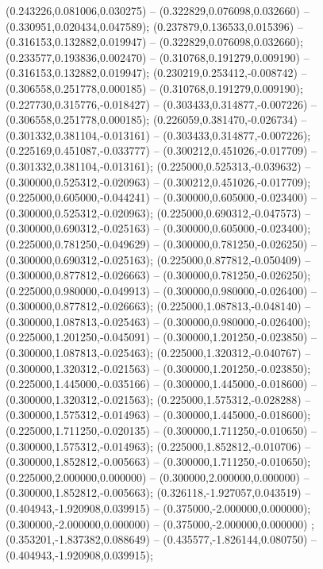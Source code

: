  (0.243226,0.081006,0.030275) -- (0.322829,0.076098,0.032660) -- (0.330951,0.020434,0.047589);
 (0.237879,0.136533,0.015396) -- (0.316153,0.132882,0.019947) -- (0.322829,0.076098,0.032660);
 (0.233577,0.193836,0.002470) -- (0.310768,0.191279,0.009190) -- (0.316153,0.132882,0.019947);
 (0.230219,0.253412,-0.008742) -- (0.306558,0.251778,0.000185) -- (0.310768,0.191279,0.009190);
 (0.227730,0.315776,-0.018427) -- (0.303433,0.314877,-0.007226) -- (0.306558,0.251778,0.000185);
 (0.226059,0.381470,-0.026734) -- (0.301332,0.381104,-0.013161) -- (0.303433,0.314877,-0.007226);
 (0.225169,0.451087,-0.033777) -- (0.300212,0.451026,-0.017709) -- (0.301332,0.381104,-0.013161);
 (0.225000,0.525313,-0.039632) -- (0.300000,0.525312,-0.020963) -- (0.300212,0.451026,-0.017709);
 (0.225000,0.605000,-0.044241) -- (0.300000,0.605000,-0.023400) -- (0.300000,0.525312,-0.020963);
 (0.225000,0.690312,-0.047573) -- (0.300000,0.690312,-0.025163) -- (0.300000,0.605000,-0.023400);
 (0.225000,0.781250,-0.049629) -- (0.300000,0.781250,-0.026250) -- (0.300000,0.690312,-0.025163);
 (0.225000,0.877812,-0.050409) -- (0.300000,0.877812,-0.026663) -- (0.300000,0.781250,-0.026250);
 (0.225000,0.980000,-0.049913) -- (0.300000,0.980000,-0.026400) -- (0.300000,0.877812,-0.026663);
 (0.225000,1.087813,-0.048140) -- (0.300000,1.087813,-0.025463) -- (0.300000,0.980000,-0.026400);
 (0.225000,1.201250,-0.045091) -- (0.300000,1.201250,-0.023850) -- (0.300000,1.087813,-0.025463);
 (0.225000,1.320312,-0.040767) -- (0.300000,1.320312,-0.021563) -- (0.300000,1.201250,-0.023850);
 (0.225000,1.445000,-0.035166) -- (0.300000,1.445000,-0.018600) -- (0.300000,1.320312,-0.021563);
 (0.225000,1.575312,-0.028288) -- (0.300000,1.575312,-0.014963) -- (0.300000,1.445000,-0.018600);
 (0.225000,1.711250,-0.020135) -- (0.300000,1.711250,-0.010650) -- (0.300000,1.575312,-0.014963);
 (0.225000,1.852812,-0.010706) -- (0.300000,1.852812,-0.005663) -- (0.300000,1.711250,-0.010650);
 (0.225000,2.000000,0.000000) -- (0.300000,2.000000,0.000000) -- (0.300000,1.852812,-0.005663);
 (0.326118,-1.927057,0.043519) -- (0.404943,-1.920908,0.039915) -- (0.375000,-2.000000,0.000000);
 (0.300000,-2.000000,0.000000) -- (0.375000,-2.000000,0.000000) ;
 (0.353201,-1.837382,0.088649) -- (0.435577,-1.826144,0.080750) -- (0.404943,-1.920908,0.039915);
